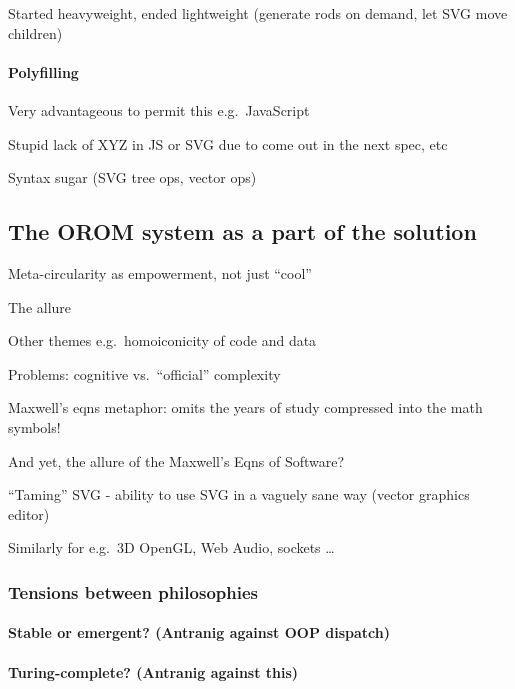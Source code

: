 \documentclass[english,submission]{programming}
\begin{document}
Started heavyweight, ended lightweight (generate rods on demand, let SVG
move children)

\hypertarget{polyfilling}{%
\paragraph{Polyfilling}\label{polyfilling}}

Very advantageous to permit this e.g.~JavaScript

Stupid lack of XYZ in JS or SVG due to come out in the next spec, etc

Syntax sugar (SVG tree ops, vector ops)

\hypertarget{the-orom-system-as-a-part-of-the-solution}{%
\subsection{The OROM system as a part of the
solution}\label{the-orom-system-as-a-part-of-the-solution}}

Meta-circularity as empowerment, not just ``cool''

The allure

Other themes e.g.~homoiconicity of code and data

Problems: cognitive vs.~``official'' complexity

Maxwell's eqns metaphor: omits the years of study compressed into the
math symbols!

And yet, the allure of the Maxwell's Eqns of Software?

``Taming'' SVG - ability to use SVG in a vaguely sane way (vector
graphics editor)

Similarly for e.g.~3D OpenGL, Web Audio, sockets \ldots{}

\hypertarget{tensions-between-philosophies}{%
\subsubsection{Tensions between
philosophies}\label{tensions-between-philosophies}}

\hypertarget{stable-or-emergent-antranig-against-oop-dispatch}{%
\paragraph{Stable or emergent? (Antranig against OOP
dispatch)}\label{stable-or-emergent-antranig-against-oop-dispatch}}

\hypertarget{turing-complete-antranig-against-this}{%
\paragraph{Turing-complete? (Antranig against
this)}\label{turing-complete-antranig-against-this}}
\end{document}
